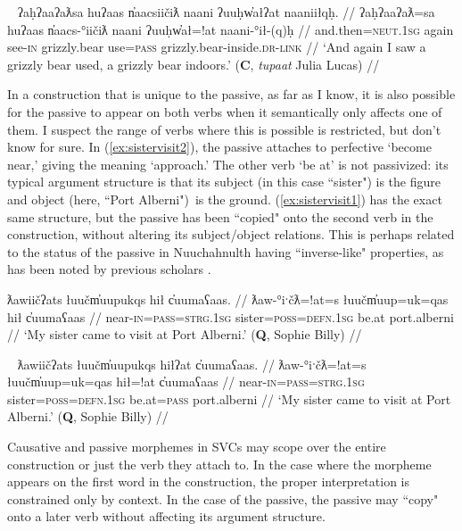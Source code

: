 \ex~ \label{ex:grizzlybearused}
\begingl
\glpreamble ʔaḥʔaaʔaƛsa huʔaas n̓aacsiičiƛ naani ʔuuḥw̓ałʔat naaniiłqḥ. //
\gla ʔaḥʔaaʔaƛ=sa huʔaas n̓aacs-°iičiƛ naani ʔuuḥw̓ał=!at naani-°ił-(q)ḥ //
\glb and.then=\textsc{neut.1sg} again see-\textsc{in} grizzly.bear use=\textsc{pass} grizzly.bear-inside.\textsc{dr}-\textsc{link} //
\glft `And again I saw a grizzly bear used, a grizzly bear indoors.' (\textbf{C}, \textit{tupaat} Julia Lucas) //
\endgl
\xe

In a construction that is unique to the passive, as far as I know, it is also possible for the passive to appear on both verbs when it semantically only affects one of them. I suspect the range of verbs where this is possible is restricted, but don't know for sure. In (\ref{ex:sistervisit2}), the passive attaches to perfective `become near,' giving the meaning `approach.' The other verb `be at' is not passivized: its typical argument structure is that its subject (in this case ``sister") is the figure and object (here, ``Port Alberni") is the ground. (\ref{ex:sistervisit1}) has the exact same structure, but the passive has been ``copied" onto the second verb in the construction, without altering its subject/object relations. This is perhaps related to the status of the passive in Nuuchahnulth having ``inverse-like" properties, as has been noted by previous scholars \citep{emanatian1988, braithwaite2003}.

\ex \label{ex:sistervisit2}
\begingl
\glpreamble ƛawiičʔats łuučm̓uupukqs hił c̓uumaʕaas. //
\gla ƛaw-°iˑčƛ=!at=s łuučm̓uup=uk=qas hił c̓uumaʕaas //
\glb near-\textsc{in}=\textsc{pass}=\textsc{strg.1sg} sister=\textsc{poss}=\textsc{defn.1sg} be.at port.alberni //
\glft `My sister came to visit at Port Alberni.' (\textbf{Q}, Sophie Billy) //
\endgl
\xe

\ex~ \label{ex:sistervisit1}
\begingl
\glpreamble ƛawiičʔats łuučm̓uupukqs hiłʔat c̓uumaʕaas. //
\gla ƛaw-°iˑčƛ=!at=s łuučm̓uup=uk=qas hił=!at c̓uumaʕaas //
\glb near-\textsc{in}=\textsc{pass}=\textsc{strg.1sg} sister=\textsc{poss}=\textsc{defn.1sg} be.at=\textsc{pass} port.alberni //
\glft `My sister came to visit at Port Alberni.' (\textbf{Q}, Sophie Billy) //
\endgl
\xe

Causative and passive morphemes in SVCs may scope over the entire construction or just the verb they attach to. In the case where the morpheme appears on the first word in the construction, the proper interpretation is constrained only by context. In the case of the passive, the passive may ``copy" onto a later verb without affecting its argument structure.

